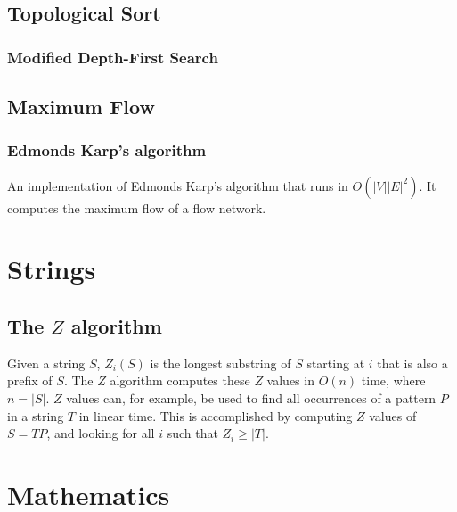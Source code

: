 \documentclass[10pt,a4paper,titlepage]{article}
\begin{document}
		\subsection{Topological Sort}
			\subsubsection{Modified Depth-First Search}
				
		\subsection{Maximum Flow}
			\subsubsection{Edmonds Karp's algorithm}
				An implementation of Edmonds Karp's algorithm that runs in $O(|V||E|^2)$. It computes the maximum flow of a flow network.
				

	\section{Strings}
		\subsection{The $Z$ algorithm}
			Given a string $S$, $Z_i(S)$ is the longest substring of $S$ starting at $i$ that is also a prefix of $S$. The $Z$ algorithm computes these $Z$ values in $O(n)$ time, where $n = |S|$. $Z$ values can, for example, be used to find all occurrences of a pattern $P$ in a string $T$ in linear time. This is accomplished by computing $Z$ values of $S = T P$, and looking for all $i$ such that $Z_i \geq |T|$.

			

	\section{Mathematics}
\end{document}
